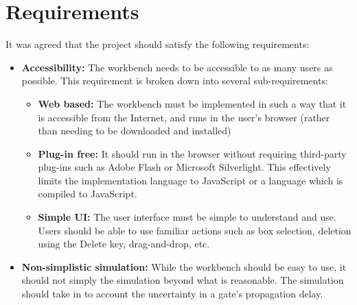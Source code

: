 \chapter{Requirements}
It was agreed that the project should satisfy the following requirements:

\begin{itemize}
	\item \textbf{Accessibility:} The workbench needs to be accessible to as many users as possible. This requirement is broken down into several sub-requirements:
	
		\begin{itemize}
			\item \textbf{Web based:} The workbench must be implemented in such a way that it is accessible from the Internet, and runs in the user's browser (rather than needing to be downloaded and installed) 
			
			\item \textbf{Plug-in free:} It should run in the browser without requiring third-party plug-ins such as Adobe Flash or Microsoft Silverlight. This effectively limits the implementation language to JavaScript or a language which is compiled to JavaScript.
			
			\item \textbf{Simple UI:} The user interface must be simple to understand and use. Users should be able to use familiar actions such as box selection, deletion using the Delete key, drag-and-drop, etc.
		\end{itemize}
	
	\item \textbf{Non-simplistic simulation:} While the workbench should be easy to use, it should not simply the simulation beyond what is reasonable. The simulation should take in to account the uncertainty in a gate's propagation delay.
\end{itemize}

